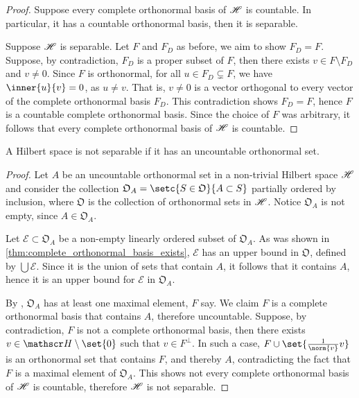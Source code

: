 \begin{proof}
    Suppose every complete orthonormal basis of \(\mathscr{H}\) is countable. In particular, it has a countable orthonormal basis, then it is separable.

    Suppose \(\mathscr{H}\) is separable. Let \(F\) and \(F_D\) as before, we aim to show \(F_D = F\). Suppose, by contradiction, \(F_D\) is a proper subset of \(F\), then there exists \(v \in F \setminus F_D\) and \(v \neq 0\). Since \(F\) is orthonormal, for all \(u \in F_D \subsetneq F\), we have \(\inner{u}{v} = 0\), as \(u \neq v\). That is, \(v\neq 0\) is a vector orthogonal to every vector of the complete orthonormal basis \(F_D\). This contradiction shows \(F_D = F\), hence \(F\) is a countable complete orthonormal basis. Since the choice of \(F\) was arbitrary, it follows that every complete orthonormal basis of \(\mathscr{H}\) is countable.
\end{proof}
\begin{corollary}
    A Hilbert space is not separable if it has an uncountable orthonormal set.
\end{corollary}
\begin{proof}
    Let \(A\) be an uncountable orthonormal set in a non-trivial Hilbert space \(\mathscr{H}\) and consider the collection \(\mathfrak{O}_A = \setc{S \in \mathfrak{O}}{A \subset S}\) partially ordered by inclusion, where \(\mathfrak{O}\) is the collection of orthonormal sets in \(\mathscr{H}\). Notice \(\mathfrak{O}_A\) is not empty, since \(A \in \mathfrak{O}_A\).

    Let \(\mathcal{E} \subset \mathfrak{O}_A\) be a non-empty linearly ordered subset of \(\mathfrak{O}_A\). As was shown in \cref{thm:complete_orthonormal_basis_exists}, \(\mathcal{E}\) has an upper bound in \(\mathfrak{O}\), defined by \(\bigcup \mathcal{E}\). Since it is the union of sets that contain \(A\), it follows that it contains \(A\), hence it is an upper bound for \(\mathcal{E}\) in \(\mathfrak{O}_A\).

    By , \(\mathfrak{O}_A\) has at least one maximal element, \(F\) say. We claim \(F\) is a complete orthonormal basis that contains \(A\), therefore uncountable. Suppose, by contradiction, \(F\) is not a complete orthonormal basis, then there exists \(v \in \hilbert \setminus \set{0}\) such that \(v \in F^\perp\). In such a case, \(F \cup \set{\frac{1}{\norm{v}}v}\) is an orthonormal set that contains \(F\), and thereby \(A\), contradicting the fact that \(F\) is a maximal element of \(\mathfrak{O}_A\). This shows not every complete orthonormal basis of \(\mathscr{H}\) is countable, therefore \(\mathscr{H}\) is not separable.
\end{proof}

